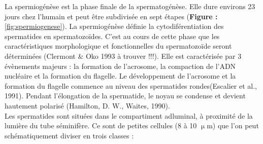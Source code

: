 \documentclass[12pt,twoside]{reedthesis}
\theoremstyle{definition}
\theoremstyle{definition}
\theoremstyle{remark}
\begin{document}
  La spermiogénèse est la phase finale de la spermatogénèse. Elle dure
  environs 23 jours chez l'humain et peut être subdivisée en sept étapes
  (\textbf{Figure : }\ref{fig:spermiogenese}). La spermiogénèse définie la
  cytodiférentiation des spermatides en spermatozoïdes. C'est au cours de
  cette phase que les caractéristiques morphologique et fonctionnelles du
  spermatozoïde seront déterminées (Clermont \& Oko 1993 à trouver !!!).
  Elle est caractérisée par 3 évènements majeurs : la formation de
  l'acrosome, la compaction de l'ADN nucléaire et la formation du
  flagelle. Le développement de l'acrosome et la formation du flagelle
  commence au niveau des spermatides rondes(Escalier et al., 1991).
  Pendant l'élongation de la spermatide, le noyau se condense et devient
  hautement polarisé (Hamilton, D. W., Waites, 1990).\\
  Les spermatides sont situées dans le compartiment adluminal, à proximité
  de la lumière du tube séminifère. Ce sont de petites cellules (8 à 10
  \(\upmu\)m) que l'on peut schématiquement diviser en trois classes :
  
\end{document}
